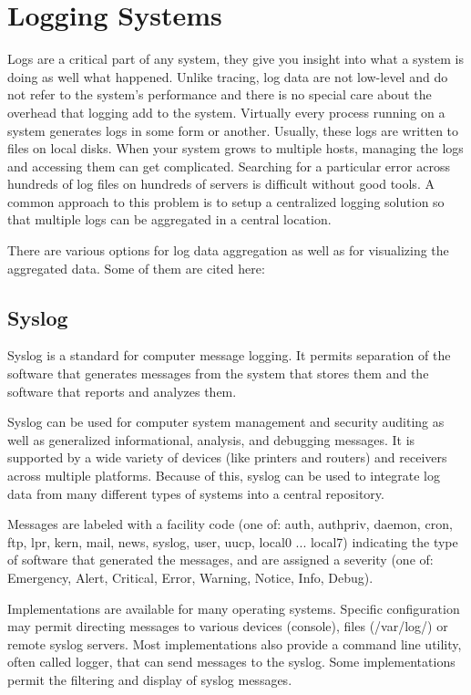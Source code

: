 \section{Logging Systems}\label{sec:logging-bkg}

Logs are a critical part of any system, they give you insight into what a system
is doing as well what happened. Unlike tracing, log data are not low-level and
do not refer to the system's performance and there is no special care about the
overhead that logging add to the system. Virtually every process running on a
system generates logs in some form or another. Usually, these logs are written
to files on local disks. When your system grows to multiple hosts, managing the
logs and accessing them can get complicated. Searching for a particular error
across hundreds of log files on hundreds of servers is difficult without good
tools. A common approach to this problem is to setup a centralized logging
solution so that multiple logs can be aggregated in a central location.

There are various options for log data aggregation as well as for visualizing
the aggregated data. Some of them are cited here:

\subsection{Syslog}

Syslog is a standard for computer message logging. It permits separation of the
software that generates messages from the system that stores them and the
software that reports and analyzes them.

Syslog can be used for computer system management and security auditing as well
as generalized informational, analysis, and debugging messages. It is supported
by a wide variety of devices (like printers and routers) and receivers across
multiple platforms. Because of this, syslog can be used to integrate log data
from many different types of systems into a central repository.

Messages are labeled with a facility code (one of: auth, authpriv, daemon, cron,
ftp, lpr, kern, mail, news, syslog, user, uucp, local0 ... local7) indicating
the type of software that generated the messages, and are assigned a severity
(one of: Emergency, Alert, Critical, Error, Warning, Notice, Info, Debug).

Implementations are available for many operating systems. Specific configuration
may permit directing messages to various devices (console), files (/var/log/) or
remote syslog servers. Most implementations also provide a command line utility,
often called logger, that can send messages to the syslog. Some implementations
permit the filtering and display of syslog messages.

